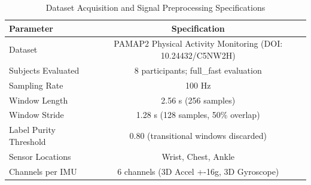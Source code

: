 \begin{table}[htbp]
\caption{Dataset Acquisition and Signal Preprocessing Specifications}
\label{tab:dataset_specs}
\centering
\begin{tabular}{lc}
\hline
Parameter & Specification \\ \hline
Dataset & PAMAP2 Physical Activity Monitoring (DOI: 10.24432/C5NW2H) \\
Subjects Evaluated & 8 participants; full\_fast evaluation \\
Sampling Rate & 100 Hz \\
Window Length & 2.56 s (256 samples) \\
Window Stride & 1.28 s (128 samples, 50\% overlap) \\
Label Purity Threshold & 0.80 (transitional windows discarded) \\
Sensor Locations & Wrist, Chest, Ankle \\
Channels per IMU & 6 channels (3D Accel +-16g, 3D Gyroscope) \\
\hline
\end{tabular}
\end{table}
